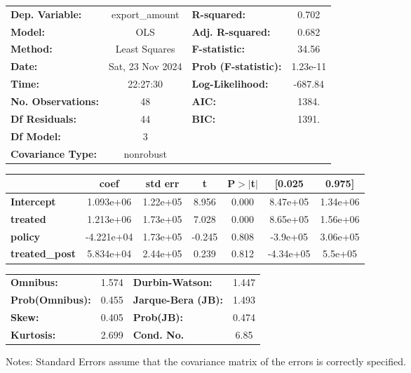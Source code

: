 \begin{center}
\begin{tabular}{lclc}
\toprule
\textbf{Dep. Variable:}    &  export\_amount  & \textbf{  R-squared:         } &     0.702   \\
\textbf{Model:}            &       OLS        & \textbf{  Adj. R-squared:    } &     0.682   \\
\textbf{Method:}           &  Least Squares   & \textbf{  F-statistic:       } &     34.56   \\
\textbf{Date:}             & Sat, 23 Nov 2024 & \textbf{  Prob (F-statistic):} &  1.23e-11   \\
\textbf{Time:}             &     22:27:30     & \textbf{  Log-Likelihood:    } &   -687.84   \\
\textbf{No. Observations:} &          48      & \textbf{  AIC:               } &     1384.   \\
\textbf{Df Residuals:}     &          44      & \textbf{  BIC:               } &     1391.   \\
\textbf{Df Model:}         &           3      & \textbf{                     } &             \\
\textbf{Covariance Type:}  &    nonrobust     & \textbf{                     } &             \\
\bottomrule
\end{tabular}
\begin{tabular}{lcccccc}
                       & \textbf{coef} & \textbf{std err} & \textbf{t} & \textbf{P$> |$t$|$} & \textbf{[0.025} & \textbf{0.975]}  \\
\midrule
\textbf{Intercept}     &    1.093e+06  &     1.22e+05     &     8.956  &         0.000        &     8.47e+05    &     1.34e+06     \\
\textbf{treated}       &    1.213e+06  &     1.73e+05     &     7.028  &         0.000        &     8.65e+05    &     1.56e+06     \\
\textbf{policy}        &   -4.221e+04  &     1.73e+05     &    -0.245  &         0.808        &     -3.9e+05    &     3.06e+05     \\
\textbf{treated\_post} &    5.834e+04  &     2.44e+05     &     0.239  &         0.812        &    -4.34e+05    &      5.5e+05     \\
\bottomrule
\end{tabular}
\begin{tabular}{lclc}
\textbf{Omnibus:}       &  1.574 & \textbf{  Durbin-Watson:     } &    1.447  \\
\textbf{Prob(Omnibus):} &  0.455 & \textbf{  Jarque-Bera (JB):  } &    1.493  \\
\textbf{Skew:}          &  0.405 & \textbf{  Prob(JB):          } &    0.474  \\
\textbf{Kurtosis:}      &  2.699 & \textbf{  Cond. No.          } &     6.85  \\
\bottomrule
\end{tabular}
\end{center}

Notes: \newline
 [1] Standard Errors assume that the covariance matrix of the errors is correctly specified.